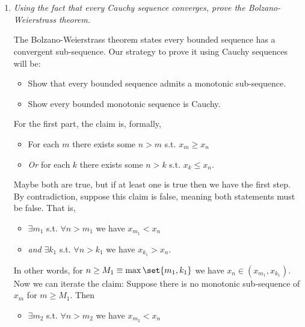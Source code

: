 \documentclass{article}
\begin{document}
\displayoptions

\section{}

\begin{enumerate}[1.]
  \item \textit{Using the fact that every Cauchy sequence converges, prove the Bolzano-Weierstrass theorem.}

    \solution The Bolzano-Weierstrass theorem states every bounded sequence has a convergent sub-sequence. Our strategy to prove it using Cauchy sequences will be:
    \begin{itemize}[label=$\bullet$]
      \item Show that every bounded sequence admits a monotonic sub-sequence.

      \item Show every bounded monotonic sequence is Cauchy.
    \end{itemize}

    For the first part, the claim is, formally,
    \begin{itemize}[label=$\bullet$]
      \item For each $m$ there exists some $n > m$ s.t. $x_m \ge x_n$

      \item \textit{Or} for each $k$ there exists some $n > k$ s.t. $x_k \le x_n$.
    \end{itemize}

    Maybe both are true, but if at least one is true then we have the first step. By contradiction, suppose this claim is false, meaning both statements must be false. That is,
    \begin{itemize}[label=$\bullet$]
      \item $\exists m_1$ s.t. $\forall n > m_1$ we have $x_{m_1} < x_n$

      \item \textit{and} $\exists k_1$ s.t. $\forall n > k_1$ we have $x_{k_1} > x_n$.
    \end{itemize}

    In other words, for $n \ge M_1 \equiv \max\set{m_1, k_1}$ we have $x_n \in (x_{m_1}, x_{k_1})$. Now we can iterate the claim: Suppose there is no monotonic sub-sequence of $x_m$ for $m \ge M_1$. Then
    \begin{itemize}[label=$\bullet$]
      \item $\exists m_2$ s.t. $\forall n > m_2$ we have $x_{m_2} < x_n$


\end{itemize}
\end{enumerate}
\end{document}
